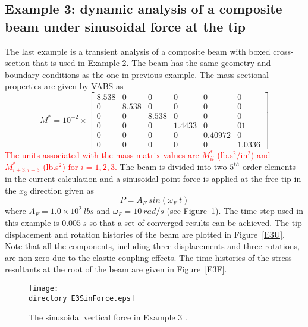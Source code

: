 \subsection{Example 3: dynamic analysis of a composite beam under sinusoidal force at the tip}

The last example is a transient analysis of a composite beam with boxed cross-section that is used in Example 2. The beam has the same geometry and boundary conditions as the one in previous example. The mass sectional properties are given by VABS \cite{Yu-etal:2002,Wang-Yu:2012} as
\begin{equation}
    \label{E3Mass}
    M^* = 10^{-2} \times \begin{bmatrix}
	8.538 & 0     & 0     & 0      & 0      & 0      \\
	0       & 8.538 & 0     & 0      & 0      & 0      \\
	0       & 0     & 8.538 & 0      & 0      & 0      \\
	0       & 0     & 0     & 1.4433  & 0  & 01 \\
	0       & 0     & 0     & 0  & 0.40972  &0 \\
	0       & 0     & 0     & 0 & 0 & 1.0336
\end{bmatrix}    
\end{equation}
\textcolor{red}{The units associated with the mass matrix values are $M_{ii}^*$ (lb.s$^2$/in$^2$) and $M_{i+3,i+3}^*$ (lb.s$^2$) for $i = 1,2,3$.} The beam is divided into two $5^{th}$ order elements in the current calculation and a sinusoidal point force is applied at the free tip in the $x_3$ direction given as
\begin{equation}
    \label{E3AppliedForce}
    P = A_F~sin(\omega_F~t)
\end{equation}
where $A_F = 1.0 \times 10^2~lbs$ and $\omega_F = 10~rad/s$ (see Figure~\ref{E3SinForce}). The time step used in this example is $0.005~s$ so that a set of converged results can be achieved. The tip displacement and rotation histories of the beam are plotted in Figure~\ref{E3U}. Note that all the components, including three displacements and three rotations, are non-zero due to the elastic coupling effects. The time histories of the stress resultants at the root of the beam are given in Figure~\ref{E3F}.
\begin{figure}
    \centering
    \texttt{[image: \\directory E3SinForce.eps]}
    \caption{The sinusoidal vertical force in Example 3 .}
    \label{E3SinForce}
\end{figure}

